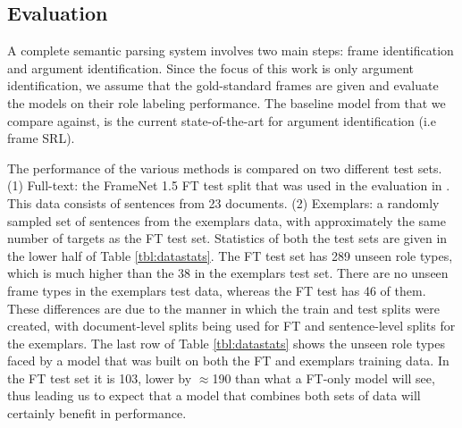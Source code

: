 \documentclass[11pt,a4paper]{article}
\begin{document}
\subsection{Evaluation}
A complete semantic parsing system involves two main steps: frame identification and argument identification. Since the focus of this work is only 
argument identification, we assume that the gold-standard frames are given and evaluate the models on their role labeling performance.
The baseline model from \citet{das-14} that we compare against, is the current state-of-the-art for argument identification (i.e frame SRL).

The performance of the various methods is compared on two different test sets.
(1) Full-text: the FrameNet 1.5 FT test split that was used in the evaluation in \citet{das-14}. This data consists of sentences from 23 documents. 
(2) Exemplars: a randomly sampled set of sentences from the exemplars data, with approximately the same number of targets as the FT test set.
Statistics of both the test sets are given in the lower half of Table \ref{tbl:datastats}. 
The FT test set has 289 unseen role types, which is much higher than
the 38 in the exemplars test set. There are no unseen frame types in the exemplars test data, whereas the FT test has 46 of them. 
These differences are due to the manner in which the train and test splits were created, with document-level splits being used
for FT and sentence-level splits for the exemplars.
The last row of Table \ref{tbl:datastats} shows the unseen role types faced by a model that was built on both the FT and exemplars training data.
In the FT test set it is 103, lower by $\approx$190 than what a FT-only model will see, thus leading us to expect that a model that combines
both sets of data will certainly benefit in performance.
\end{document}
